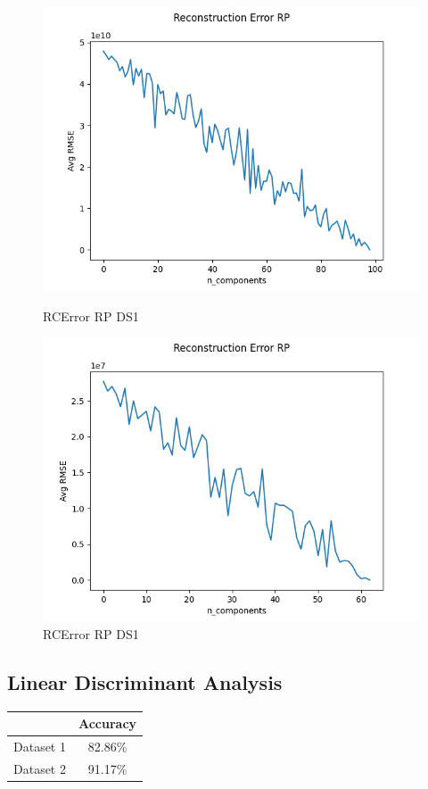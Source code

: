 \begin{figure}
    \begin{minipage}{0.5\textwidth}
        \centering
        \includegraphics[width=.9\linewidth]{rpds1.png}
        \caption{RCError RP DS1}\label{Fig:RP DS1}
    \end{minipage}\hfill
    \begin{minipage}{0.5\textwidth}
        \centering
        \includegraphics[width=.9\linewidth]{rpds2.png}
        \caption{RCError RP DS1}\label{Fig:RP DS2}
    \end{minipage}
\end{figure}

\subsection{Linear Discriminant Analysis}\label{subsec:linear-discriminant-analysis}
\begin{center}
    \begin{tabular}{|c| c |}
        \hline
        & Accuracy \\
        \hline
        \hline
        Dataset 1 & 82.86\%  \\
        \hline
        Dataset 2 & 91.17\%  \\
        \hline
    \end{tabular}
\end{center}